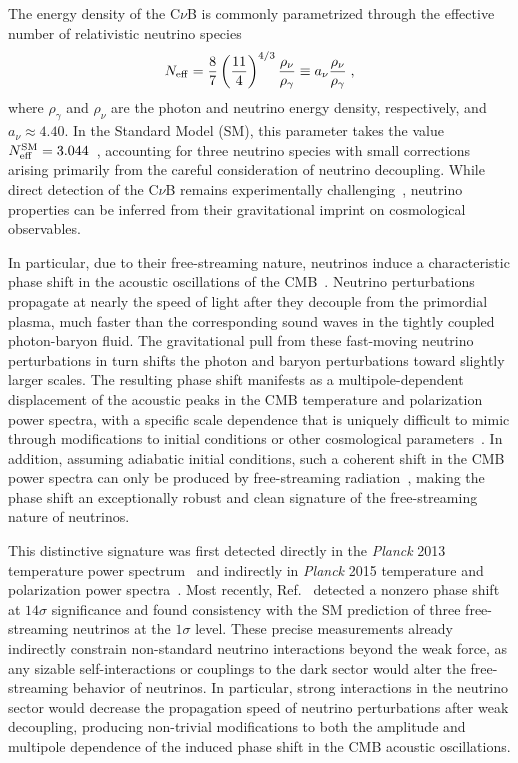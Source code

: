 The energy density of the C$\nu$B is commonly parametrized through the effective number of relativistic neutrino species
\begin{equation}
    N_{\rm eff}=\frac{8}{7}\left(\frac{11}{4}\right)^{4/3}\frac{\rho_\nu}{\rho_\gamma}\equiv a_\nu \frac{\rho_\nu}{\rho_\gamma}\;,
    \label{eq:ch13-Neff}
\end{equation}
where $\rho_\gamma$ and $\rho_\nu$ are the photon and neutrino energy density, respectively, and $a_\nu\approx 4.40$. In the Standard Model (SM), this parameter takes the value $N_{\rm eff}^{\rm SM} = 3.044$~\cite{Akita:2020szl, Froustey:2020mcq, Bennett:2020zkv, Cielo:2023bqp, Drewes:2024wbw, Drewes:2024nbg}, accounting for three neutrino species with small corrections arising primarily from the careful consideration of neutrino decoupling. While direct detection of the C$\nu$B remains experimentally challenging~\cite{Bauer:2022lri, PTOLEMY:2019hkd}, neutrino properties can be inferred from their gravitational imprint on cosmological observables.

In particular, due to their free-streaming nature, neutrinos induce a characteristic phase shift in the acoustic oscillations of the CMB~\cite{Bashinsky:2003tk,Follin:2015hya,Baumann:2015rya}. Neutrino perturbations propagate at nearly the speed of light after they decouple from the primordial plasma, much faster than the corresponding sound waves in the tightly coupled photon-baryon fluid. The gravitational pull from these fast-moving neutrino perturbations in turn shifts the
photon and baryon perturbations toward slightly larger scales.  The resulting phase shift manifests as a multipole-dependent displacement of the acoustic peaks in the CMB temperature and polarization power spectra, with a specific scale dependence that is uniquely difficult to mimic through modifications to initial conditions or other cosmological parameters~\cite{Baumann:2015rya}. In addition, assuming adiabatic initial conditions, such a coherent shift in the CMB power spectra can only be produced by free-streaming radiation~\cite{Baumann:2015rya}, making the phase shift an exceptionally robust and clean signature of the free-streaming nature of neutrinos.

This distinctive signature was first detected directly in the \textit{Planck} 2013 temperature power spectrum~\cite{Follin:2015hya} and indirectly in \textit{Planck} 2015 temperature and polarization power spectra~\cite{Baumann:2015rya}. Most recently, Ref.~\cite{Montefalcone:2025unv} detected a nonzero phase shift at $14\sigma$ significance and found consistency with the SM prediction of three free-streaming neutrinos at the $1\sigma$ level. These precise measurements already indirectly constrain non-standard neutrino interactions beyond the weak force, as any sizable self-interactions or couplings to the dark sector would alter the free-streaming behavior of neutrinos. In particular, strong interactions in the neutrino sector would decrease the propagation speed of neutrino perturbations after weak decoupling, producing non-trivial modifications to both the amplitude and multipole dependence of the induced phase shift in the CMB acoustic oscillations.

